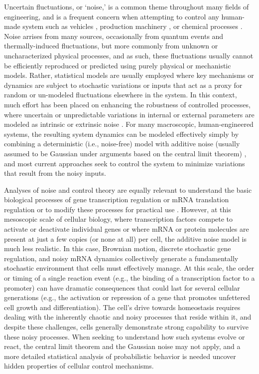 \documentclass[12pt]{iopart}
\begin{document}
Uncertain fluctuations, or `noise,' is a common theme throughout many fields of engineering, and is a frequent concern when attempting to control any human-made system such as vehicles , production machinery , or chemical processes .
Noise arrises from many sources, occasionally from quantum events and thermally-induced fluctuations, but more commonly from unknown or uncharacterized physical processes, and as such, these fluctuations usually cannot be efficiently reproduced or predicted using purely physical or mechanistic models.
Rather, statistical models are usually employed where key mechanisms or dynamics are subject to stochastic variations or inputs that act as a proxy for random or un-modeled fluctuations elsewhere in the system.
In this context, much effort has been placed on enhancing the robustness of controlled processes, where uncertain or unpredictable variations in internal or external parameters are modeled as intrinsic or extrinsic noise .
For many macroscopic, human-engineered systems, the resulting system dynamics can be modeled effectively simply by combining a deterministic (i.e., noise-free) model with additive noise (usually assumed to be Gaussian under arguments based on the central limit theorem) , and most current approaches seek to control the system to minimize variations that result from the noisy inputs. 

Analyses of noise and control theory are equally relevant to understand the basic biological processes of gene transcription regulation  or mRNA translation regulation or to modify these processes for practical use .
However, at this mesoscopic scale of cellular biology, where transcription factors compete to activate or deactivate individual genes or where mRNA or protein molecules are present at just a few copies (or none at all) per cell, the additive noise model is much less realistic.
In this case, Brownian motion, discrete stochastic gene regulation, and noisy mRNA dynamics collectively generate a fundamentally stochastic environment that cells must effectively manage. 
At this scale, the order or timing of a single reaction event (e.g., the binding of a transcription factor to a promoter) can have dramatic consequences that could last for several cellular generations (e.g., the activation or repression of a gene that promotes unfettered cell growth and differentiation). 
The cell's drive towards homeostasis requires dealing with the inherently chaotic and noisy processes that reside within it, and despite these challenges, cells generally demonstrate strong capability to survive these noisy processes. 
When seeking to understand how such systems evolve or react, the central limit theorem and the Gaussian noise may not apply, and a more detailed statistical analysis of probabilistic behavior is needed uncover hidden properties of cellular control mechanisms.
\end{document}
